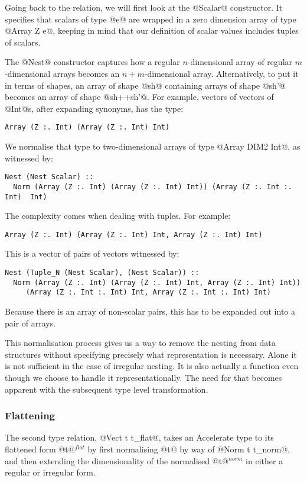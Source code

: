 Going back to the relation, we will first look at the @Scalar@ constructor. It specifies that scalars of type @e@ are wrapped in a zero dimension array of type @Array Z e@, keeping in mind that our definition of scalar values includes tuples of scalars.

The @Nest@ constructor captures how a regular $n$-dimensional array of regular $m$-dimensional arrays becomes an $n+m$-dimensional array. Alternatively, to put it in terms of shapes, an array of shape @sh@ containing arrays of shape @sh'@ becomes an array of shape @sh++sh'@.
For example, vectors of vectors of @Int@s, after expanding synonyms, has the type:
%
\begin{lstlisting}[style=ndp]
Array (Z :. Int) (Array (Z :. Int) Int)
\end{lstlisting}
%
We normalise that type to two-dimensional arrays of type @Array DIM2 Int@, as witnessed by:
%
\begin{lstlisting}[style=ndp]
Nest (Nest Scalar) ::
  Norm (Array (Z :. Int) (Array (Z :. Int) Int)) (Array (Z :. Int :. Int)  Int)
\end{lstlisting}
%
The complexity comes when dealing with tuples. For example:
%
\begin{lstlisting}[style=ndp]
Array (Z :. Int) (Array (Z :. Int) Int, Array (Z :. Int) Int)
\end{lstlisting}
%
This is a vector of pairs of vectors witnessed by:
%
\begin{lstlisting}[style=ndp]
Nest (Tuple_N (Nest Scalar), (Nest Scalar)) ::
  Norm (Array (Z :. Int) (Array (Z :. Int) Int, Array (Z :. Int) Int))
     (Array (Z :. Int :. Int) Int, Array (Z :. Int :. Int) Int)
\end{lstlisting}
%
Because there is an array of non-scalar pairs, this has to be expanded out into a pair of arrays.

This normalisation process gives us a way to remove the nesting from data structures without specifying precisely what representation is necessary. Alone it is not sufficient in the case of irregular nesting. It is also actually a function even though we choose to handle it representationally. The need for that becomes apparent with the subsequent type level transformation.

\subsubsection{Flattening}
The second type relation, @Vect t t_flat@, takes an Accelerate type to its flattened form @t@$^{\textit{flat}}$ by first normalising @t@ by way of @Norm t t_norm@, and then extending the dimensionality of the normalised @t@$^{\textit{norm}}$ in either a regular or irregular form.


